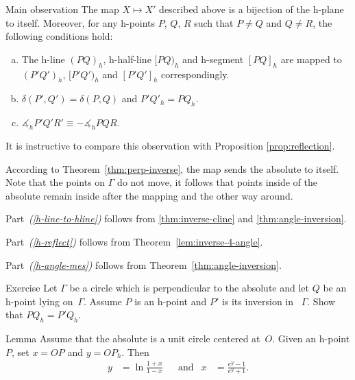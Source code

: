 \begin{thm}{Main observation}\label{thm:main-observ}
The map $X\mapsto X'$ described above is a bijection of the h-plane to itself. 
Moreover, for any h-points $P$, $Q$, $R$ such that $P\ne Q$ and $Q\ne R$, the following conditions hold:
\begin{enumerate}[(a)]
\item\label{h-line-to-hline} The h-line $(PQ)_h$, h-half-line $[PQ)_h$ and h-segment $[PQ]_h$ are mapped to $(P'Q')_h$, $[P'Q')_h$ and $[P'Q']_h$ correspondingly.
\item\label{h-reflect} $\delta(P',Q')=\delta(P,Q)$ and $P'Q'_h=PQ_h$.
\item\label{h-angle-mes} 
$\measuredangle_h P'Q'R'\equiv-\measuredangle_h PQR$.
\end{enumerate}

\end{thm}

It is instructive to compare this observation with Proposition \ref{prop:reflection}.

According to Theorem~\ref{thm:perp-inverse}, the map sends the absolute to itself. 
Note that the points on $\Gamma$ do not move, it follows that points inside of the absolute remain inside after the mapping and the other way around. 


Part~\textit{(\ref{h-line-to-hline})} follows from \ref{thm:inverse-cline} and \ref{thm:angle-inversion}.

Part~\textit{(\ref{h-reflect})} follows from Theorem~\ref{lem:inverse-4-angle}.

Part~\textit{(\ref{h-angle-mes})} follows from Theorem~\ref{thm:angle-inversion}.
\qeds


\begin{thm}{Exercise}\label{ex:h-reflection}
Let $\Gamma$ be a circle which is perpendicular to the absolute and let $Q$ be an h-point lying on~$\Gamma$.
Assume $P$ is an h-point and $P'$ is its inversion in ~$\Gamma$.
Show that $PQ_h=P'Q_h$.
\end{thm}

\begin{thm}{Lemma}\label{lem:O-h-dist}
Assume that the absolute is a unit circle centered at~$O$.
Given an h-point $P$, set $x=OP$ and $y=OP_h$.
Then
\begin{align*}
y&=\ln\frac{1+x}{1-x}
&
&\text{and}
&
x&=\frac{e^y-1}{e^y+1}.
\end{align*}
 
\end{thm}

